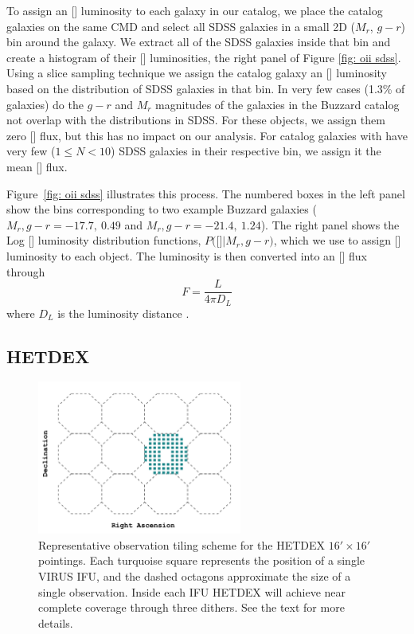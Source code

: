 To assign an \hbox{[]} luminosity to each galaxy in our catalog, we place the catalog galaxies on the same CMD and select all SDSS galaxies in a small 2D ($M_r$, $g-r$) bin around the galaxy. We extract all of the SDSS galaxies inside that bin and create a histogram of their \hbox{[]} luminosities, the right panel of Figure \ref{fig: oii sdss}. Using a slice sampling technique \citep{Neal1997} we assign the catalog galaxy an \hbox{[]} luminosity based on the distribution of SDSS galaxies in that bin. In very few cases (1.3\% of galaxies) do the $g-r$ and $M_r$ magnitudes of the galaxies in the Buzzard catalog not overlap with the distributions in SDSS. For these objects, we assign them zero \hbox{[]} flux, but this has no impact on our analysis. For catalog galaxies with have very few ($1\leq N<10$) SDSS galaxies in their respective bin, we assign it the mean \hbox{[]} flux. 

Figure~\ref{fig: oii sdss} illustrates this process. The numbered boxes in the left panel show the bins corresponding to two example Buzzard galaxies ($M_r, g-r = -17.7,~0.49$ and $M_r, g-r = -21.4,~1.24$). The right panel shows the Log \hbox{[]} luminosity distribution functions, $P($\hbox{[]}$| M_r, g-r)$, which we use to assign \hbox{[]} luminosity to each object. The luminosity is then converted into an \hbox{[]} flux through 
\begin{equation}
	F = \frac{L}{4\pi D_L}
\end{equation}
where $D_L$ is the luminosity distance .

\subsection{HETDEX}\label{sec: hetdex}
\begin{figure}
	\begin{center}
		\includegraphics[width=0.6\textwidth]{figures1/pointings.pdf} 
	\end{center}
	\caption[HETDEX pointing strategy.]{Representative observation tiling scheme for the HETDEX $16' \times 16'$ pointings. Each turquoise square represents the position of a single VIRUS IFU, and the dashed octagons approximate the size of a single observation. Inside each IFU HETDEX will achieve near complete coverage through three dithers. See the text for more details.} 
	\label{fig: ifu layout} 
\end{figure}

